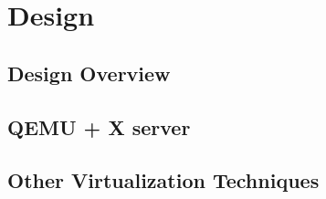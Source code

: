 \section{Design}
\subsection{Design Overview}
\subsection{QEMU + X server}
\subsection{Other Virtualization Techniques}
